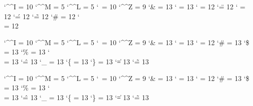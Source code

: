 

\ifdefined \xmlcatcodesn \else \newcatcodetable \xmlcatcodesn \fi %
\ifdefined \xmlcatcodese \else \newcatcodetable \xmlcatcodese \fi %
\ifdefined \xmlcatcodesr \else \newcatcodetable \xmlcatcodesr \fi %

\startcatcodetable \xmlcatcodesn
    \catcode`\^^I = 10 %
    \catcode`\^^M =  5 %
    \catcode`\^^L =  5 %
    \catcode`\    = 10 %
    \catcode`\^^Z =  9 %
    \catcode`\&   = 13 %
    \catcode`\<   = 13 %
    \catcode`\>   = 12
    \catcode`\"   = 12 %
    \catcode`\/   = 12 %
    \catcode`\'   = 12 %
    \catcode`\~   = 12 %
    \catcode`\#   = 12 %
    \catcode`\\   = 12 %
\stopcatcodetable

\startcatcodetable \xmlcatcodese
    \catcode`\^^I = 10 %
    \catcode`\^^M =  5 %
    \catcode`\^^L =  5 %
    \catcode`\    = 10 %
    \catcode`\^^Z =  9 %
    \catcode`\&   = 13 %
    \catcode`\<   = 13 %
    \catcode`\>   = 12
    \catcode`\#   = 13
    \catcode`\$   = 13
    \catcode`\%   = 13
    \catcode`\\   = 13
    \catcode`\^   = 13
    \catcode`\_   = 13
    \catcode`\{   = 13
    \catcode`\}   = 13
    \catcode`\|   = 13
    \catcode`\~   = 13
\stopcatcodetable

\startcatcodetable \xmlcatcodesr
    \catcode`\^^I = 10 %
    \catcode`\^^M =  5 %
    \catcode`\^^L =  5 %
    \catcode`\    = 10 %
    \catcode`\^^Z =  9 %
    \catcode`\&   = 13 %
    \catcode`\<   = 13 %
    \catcode`\>   = 12
    \catcode`\#   = 13
    \catcode`\$   = 13
    \catcode`\%   = 13
    \catcode`\\   = 13
    \catcode`\^   = 13
    \catcode`\_   = 13
    \catcode`\{   = 13
    \catcode`\}   = 13
    \catcode`\|   = 13
    \catcode`\~   = 13
\stopcatcodetable


